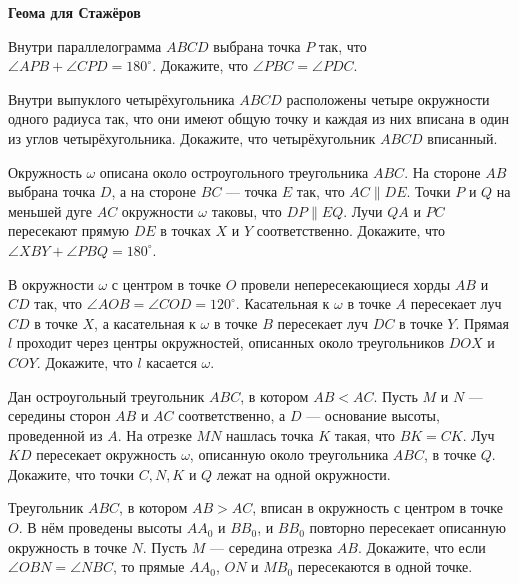 \documentclass{article}
\begin{document}
    \large


    \begin{center}
        \textbf{Геома для Стажёров}
    \end{center}


    \begin{enumerate_boxed}

        \item Внутри параллелограмма $ABCD$ выбрана точка $P$ так, что $\angle AP B+\angle CP D = 180^\circ$.
        Докажите, что $\angle PBC = \angle PDC$.

        \item Внутри выпуклого четырёхугольника $ABCD$ расположены четыре окружности одного радиуса так, что они имеют общую точку и каждая из них вписана в один из углов четырёхугольника.
        Докажите, что четырёхугольник $ABCD$ вписанный.

        \item Окружность $\omega$ описана около остроугольного треугольника $ABC$.
        На стороне $AB$ выбрана точка $D$, а на стороне $BC$ — точка $E$ так, что $AC \parallel DE$.
        Точки $P$ и $Q$ на меньшей дуге $AC$ окружности $\omega$ таковы, что $DP \parallel EQ$.
        Лучи $QA$ и $PC$ пересекают прямую $DE$ в точках $X$ и $Y$ соответственно.
        Докажите, что $\angle XBY + \angle P BQ = 180^\circ$.

        \item В окружности $\omega$ с центром в точке $O$ провели непересекающиеся хорды $AB$ и $CD$ так, что $\angle AOB = \angle COD = 120^\circ$.
        Касательная к $\omega$ в точке $A$ пересекает луч $CD$ в точке $X$, а касательная к $\omega$ в точке $B$ пересекает луч $DC$ в точке $Y$.
        Прямая $l$ проходит через центры окружностей, описанных около треугольников $DOX$ и $COY$.
        Докажите, что $l$ касается $\omega$.

        \item Дан остроугольный треугольник $ABC$, в котором $AB < AC$.
        Пусть $M$ и $N$ — середины сторон $AB$ и $AC$ соответственно, а $D$ — основание высоты, проведенной из $A$.
        На отрезке $MN$ нашлась точка $K$ такая, что $BK = CK$.
        Луч $KD$ пересекает окружность $\omega$, описанную около треугольника $ABC$, в точке $Q$.
        Докажите, что точки $C, N, K$ и $Q$ лежат на одной окружности.

        \item Треугольник $ABC$, в котором $AB > AC$, вписан в окружность с центром в точке $O$.
        В нём проведены высоты $AA_0$ и $BB_0$, и $BB_0$ повторно пересекает описанную окружность в точке $N$.
        Пусть $M$ — середина отрезка $AB$.
        Докажите, что если $\angle OBN = \angle NBC$, то прямые $AA_0$, $ON$ и $MB_0$ пересекаются в одной точке.


\end{enumerate_boxed}
\end{document}
